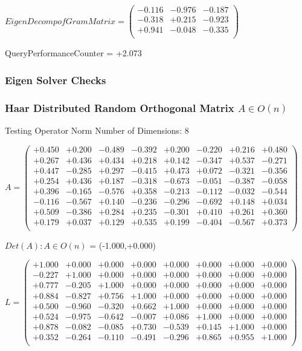 \documentclass[9pt]{article}
\theoremstyle{plain}
\theoremstyle{definition}
\theoremstyle{remark}
\numberwithin{equation}{section}
\begin{document}
$EigenDecomp of Gram Matrix = \left(
\begin{array}{
ccc}
-0.116 & -0.976 & -0.187 \\
-0.318 & +0.215 & -0.923 \\
+0.941 & -0.048 & -0.335 \\
\end{array}
\right)$ \newline 

QueryPerformanceCounter  =  +2.073
\subsubsection{Eigen Solver Checks}
\subsubsection{Haar Distributed Random Orthogonal Matrix $A \in O(n)$}
 Testing Operator Norm
Number of Dimensions: 8

$A = \left(
\begin{array}{
cccccccc}
+0.450 & +0.200 & -0.489 & -0.392 & +0.200 & -0.220 & +0.216 & +0.480 \\
+0.267 & +0.436 & +0.434 & +0.218 & +0.142 & -0.347 & +0.537 & -0.271 \\
+0.447 & -0.285 & +0.297 & -0.415 & +0.473 & +0.072 & -0.321 & -0.356 \\
+0.254 & +0.436 & +0.187 & -0.318 & -0.673 & -0.051 & -0.387 & -0.058 \\
+0.396 & -0.165 & -0.576 & +0.358 & -0.213 & -0.112 & -0.032 & -0.544 \\
-0.116 & -0.567 & +0.140 & -0.236 & -0.296 & -0.692 & +0.148 & +0.034 \\
+0.509 & -0.386 & +0.284 & +0.235 & -0.301 & +0.410 & +0.261 & +0.360 \\
+0.179 & +0.037 & +0.129 & +0.535 & +0.199 & -0.404 & -0.567 & +0.373 \\
\end{array}
\right)$ \newline 

$Det(A) :   A \in O(n)$ = (-1.000,+0.000)

$L = \left(
\begin{array}{
cccccccc}
+1.000 & +0.000 & +0.000 & +0.000 & +0.000 & +0.000 & +0.000 & +0.000 \\
-0.227 & +1.000 & +0.000 & +0.000 & +0.000 & +0.000 & +0.000 & +0.000 \\
+0.777 & -0.205 & +1.000 & +0.000 & +0.000 & +0.000 & +0.000 & +0.000 \\
+0.884 & -0.827 & +0.756 & +1.000 & +0.000 & +0.000 & +0.000 & +0.000 \\
+0.500 & -0.960 & -0.320 & +0.662 & +1.000 & +0.000 & +0.000 & +0.000 \\
+0.524 & -0.975 & -0.642 & -0.007 & +0.086 & +1.000 & +0.000 & +0.000 \\
+0.878 & -0.082 & -0.085 & +0.730 & -0.539 & +0.145 & +1.000 & +0.000 \\
+0.352 & -0.264 & -0.110 & -0.491 & -0.296 & +0.865 & +0.955 & +1.000 \\
\end{array}
\right)$ \newline 
\end{document}
